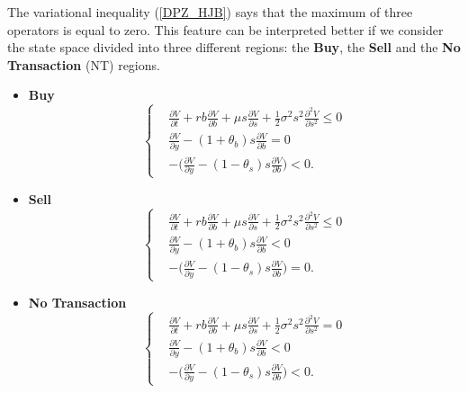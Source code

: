 \noindent
The variational inequality (\ref{DPZ_HJB}) says that the maximum of three operators is equal to zero.
This feature can be interpreted better if we consider the state space divided into three different regions: the \textbf{Buy}, the \textbf{Sell}
and the \textbf{No Transaction} (NT) regions.
\begin{itemize}
 \item \textbf{Buy}
  \begin{equation*}
   \begin{cases}
     & \frac{\partial V}{\partial t} + rb\frac{\partial V}{\partial b} + \mu s \frac{\partial V}{\partial s} + \frac{1}{2}\sigma^2 s^2 \frac{\partial^2 V}{\partial s^2} \leq 0\\ 
     & \frac{\partial V}{\partial y}-(1+\theta_b) s \frac{\partial V}{\partial b} = 0 \\
     & -\biggl(\frac{\partial V}{\partial y}-(1-\theta_s)s \frac{\partial V}{\partial b} \biggr) < 0.
   \end{cases}
  \end{equation*}
 \item \textbf{Sell}
  \begin{equation*}
   \begin{cases}
     & \frac{\partial V}{\partial t} + rb\frac{\partial V}{\partial b} + \mu s \frac{\partial V}{\partial s} + \frac{1}{2}\sigma^2 s^2 \frac{\partial^2 V}{\partial s^2} \leq 0 \\ 
     & \frac{\partial V}{\partial y}-(1+\theta_b) s \frac{\partial V}{\partial b} < 0 \\
     & -\biggl(\frac{\partial V}{\partial y}-(1-\theta_s)s \frac{\partial V}{\partial b} \biggr) = 0.
   \end{cases}
  \end{equation*}
 \item \textbf{No Transaction}
  \begin{equation*}
   \begin{cases}
     & \frac{\partial V}{\partial t} + rb\frac{\partial V}{\partial b} + \mu s \frac{\partial V}{\partial s} + \frac{1}{2}\sigma^2 s^2 \frac{\partial^2 V}{\partial s^2} = 0 \\ 
     & \frac{\partial V}{\partial y}-(1+\theta_b) s \frac{\partial V}{\partial b} < 0 \\
     & -\biggl(\frac{\partial V}{\partial y}-(1-\theta_s)s \frac{\partial V}{\partial b} \biggr) < 0.
   \end{cases}
  \end{equation*}
\end{itemize}
